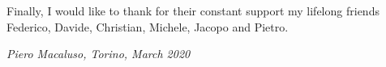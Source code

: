 Finally, I would like to thank for their constant support my lifelong friends Federico, Davide, Christian, Michele, Jacopo and Pietro.
\begin{flushright}
    \textit{Piero Macaluso, Torino, March 2020}
\end{flushright}

\tablespagetrue\figurespagetrue %
\indici

\listofalgorithms
%
%
%

